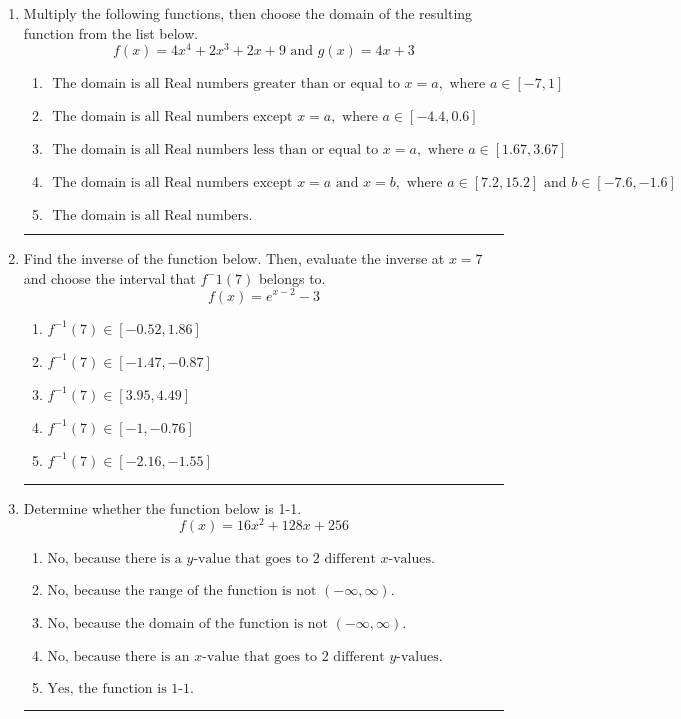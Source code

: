 \documentclass[14pt]{extbook}
\newcommand{\litem}[1]{\item#1\hspace*{-1cm}\rule{\textwidth}{0.4pt}}
\begin{document}
\begin{enumerate}
{\begin{enumerate}[label=\Alph*.]
\end{enumerate} }
\litem{
Multiply the following functions, then choose the domain of the resulting function from the list below.\[ f(x) = 4x^{4} +2 x^{3} +2 x + 9 \text{ and } g(x) = 4x + 3 \]\begin{enumerate}[label=\Alph*.]
\item \( \text{ The domain is all Real numbers greater than or equal to } x = a, \text{ where } a \in [-7, 1] \)
\item \( \text{ The domain is all Real numbers except } x = a, \text{ where } a \in [-4.4, 0.6] \)
\item \( \text{ The domain is all Real numbers less than or equal to } x = a, \text{ where } a \in [1.67, 3.67] \)
\item \( \text{ The domain is all Real numbers except } x = a \text{ and } x = b, \text{ where } a \in [7.2, 15.2] \text{ and } b \in [-7.6, -1.6] \)
\item \( \text{ The domain is all Real numbers. } \)

\end{enumerate} }
\litem{
Find the inverse of the function below. Then, evaluate the inverse at $x = 7$ and choose the interval that $f^-1(7)$ belongs to.\[ f(x) = e^{x-2}-3 \]\begin{enumerate}[label=\Alph*.]
\item \( f^{-1}(7) \in [-0.52, 1.86] \)
\item \( f^{-1}(7) \in [-1.47, -0.87] \)
\item \( f^{-1}(7) \in [3.95, 4.49] \)
\item \( f^{-1}(7) \in [-1, -0.76] \)
\item \( f^{-1}(7) \in [-2.16, -1.55] \)

\end{enumerate} }
\litem{
Determine whether the function below is 1-1.\[ f(x) = 16 x^2 + 128 x + 256 \]\begin{enumerate}[label=\Alph*.]
\item \( \text{No, because there is a $y$-value that goes to 2 different $x$-values.} \)
\item \( \text{No, because the range of the function is not $(-\infty, \infty)$.} \)
\item \( \text{No, because the domain of the function is not $(-\infty, \infty)$.} \)
\item \( \text{No, because there is an $x$-value that goes to 2 different $y$-values.} \)
\item \( \text{Yes, the function is 1-1.} \)


\end{enumerate}}
\end{enumerate}
\end{document}
